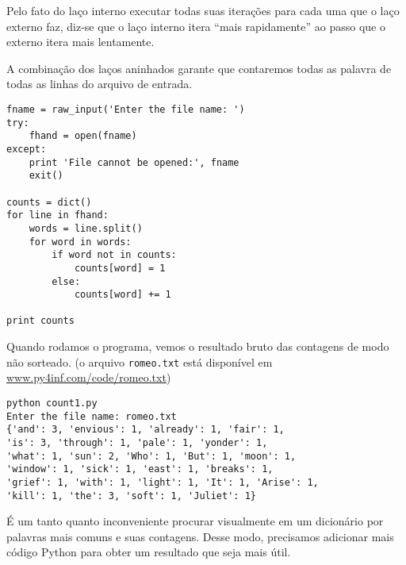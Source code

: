 Pelo fato do laço interno executar todas suas iterações para cada uma que o laço externo faz, diz-se que o laço interno itera ``mais rapidamente'' ao passo que o externo itera mais lentamente.

A combinação dos laços aninhados garante que contaremos todas as palavra de todas as linhas do arquivo de entrada.

\beforeverb
\begin{verbatim}
fname = raw_input('Enter the file name: ')
try:
    fhand = open(fname)
except:
    print 'File cannot be opened:', fname
    exit()

counts = dict()
for line in fhand:
    words = line.split()
    for word in words:
        if word not in counts:
            counts[word] = 1
        else:
            counts[word] += 1

print counts
\end{verbatim}
\afterverb
%
Quando rodamos o programa, vemos o resultado bruto das contagens de modo não sorteado.
(o arquivo {\tt romeo.txt} está disponível em \url{www.py4inf.com/code/romeo.txt})

\beforeverb
\begin{verbatim}
python count1.py
Enter the file name: romeo.txt
{'and': 3, 'envious': 1, 'already': 1, 'fair': 1,
'is': 3, 'through': 1, 'pale': 1, 'yonder': 1,
'what': 1, 'sun': 2, 'Who': 1, 'But': 1, 'moon': 1,
'window': 1, 'sick': 1, 'east': 1, 'breaks': 1,
'grief': 1, 'with': 1, 'light': 1, 'It': 1, 'Arise': 1,
'kill': 1, 'the': 3, 'soft': 1, 'Juliet': 1}
\end{verbatim}
\afterverb
%
É um tanto quanto inconveniente procurar visualmente em um dicionário por palavras mais comuns e suas contagens. Desse modo, precisamos adicionar mais código Python para obter um resultado que seja mais útil.

